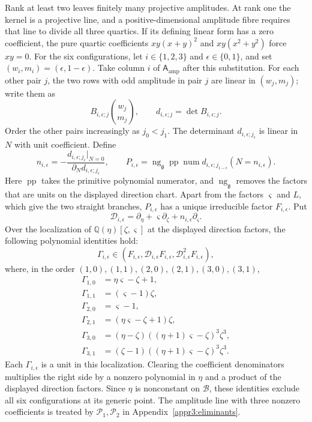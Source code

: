 \documentclass[11pt,a4paper]{article}
\numberwithin{equation}{section}
\theoremstyle{plain}
\theoremstyle{definition}
\theoremstyle{remark}
\begin{document}
Rank at least two leaves
finitely many projective amplitudes. At rank one the kernel is a
projective line, and a positive-dimensional amplitude fibre requires
that line to divide all three quartics.
If its defining linear form has a zero coefficient, the pure quartic
coefficients $xy(x+y)^2$ and $xy(x^2+y^2)$ force $xy=0$.
For the six configurations, let $i\in\{1,2,3\}$ and
$\epsilon\in\{0,1\}$, and set $(w_i,m_i)=(\epsilon,1-\epsilon)$.
Take column $i$ of $\mathsf A_{\mathrm{amp}}$ after this substitution.
For each other pair $j$, the two rows with odd amplitude in pair $j$
are linear in $(w_j,m_j)$; write them as
\[
 B_{i,\epsilon;j}\binom{w_j}{m_j},\qquad
 d_{i,\epsilon;j}=\det B_{i,\epsilon;j}.
\]
Order the other pairs increasingly as $j_0<j_1$.
The determinant $d_{i,\epsilon;j_\epsilon}$ is linear in $N$
with unit coefficient. Define
\[
 n_{i,\epsilon}
 =-\frac{d_{i,\epsilon;j_\epsilon}|_{N=0}}
           {\partial_N d_{i,\epsilon;j_\epsilon}},\qquad
 P_{i,\epsilon}
 =\operatorname{ng}_{\mathfrak g}\operatorname{pp}\operatorname{num}
       d_{i,\epsilon;j_{1-\epsilon}}(N=n_{i,\epsilon}).
\]
Here $\operatorname{pp}$ takes the primitive polynomial numerator,
and $\operatorname{ng}_{\mathfrak g}$ removes the factors that are units
on the displayed direction chart. Apart from the factors $\varsigma$ and
$L$, which give the two straight branches, $P_{i,\epsilon}$ has a
unique irreducible factor $F_{i,\epsilon}$. Put
\[
 \mathcal D_{i,\epsilon}
 =\partial_\eta+\varsigma\partial_\zeta
                   +n_{i,\epsilon}\partial_\varsigma.
\]
Over the localization of $\mathbb Q(\eta)[\zeta,\varsigma]$ at the
displayed direction factors, the following polynomial identities hold:
\[
 \Gamma_{i,\epsilon}\in
 (F_{i,\epsilon},\mathcal D_{i,\epsilon}F_{i,\epsilon},
                   \mathcal D_{i,\epsilon}^2F_{i,\epsilon}),
\]
where, in the order $(1,0),(1,1),(2,0),(2,1),(3,0),(3,1)$,
\[
\begin{aligned}
 \Gamma_{1,0}&=\eta\varsigma-\zeta+1,\\
 \Gamma_{1,1}&=(\varsigma-1)\zeta,\\
 \Gamma_{2,0}&=\varsigma-1,\\
 \Gamma_{2,1}&=(\eta\varsigma-\zeta+1)\zeta,\\
 \Gamma_{3,0}&=(\eta-\zeta)
               ((\eta+1)\varsigma-\zeta)^3\zeta^3,\\
 \Gamma_{3,1}&=(\zeta-1)
               ((\eta+1)\varsigma-\zeta)^3\zeta^3.
\end{aligned}
\]
Each $\Gamma_{i,\epsilon}$ is a unit in this localization.
Clearing the coefficient denominators multiplies the right side by a
nonzero polynomial in $\eta$ and a product of the displayed direction
factors. Since $\eta$ is nonconstant on $\mathscr B$, these identities
exclude all six configurations at its generic point.
The amplitude line with three nonzero coefficients is treated by
$\mathcal P_1,\mathcal P_2$ in Appendix~\ref{appr3:eliminants}.
\end{document}
